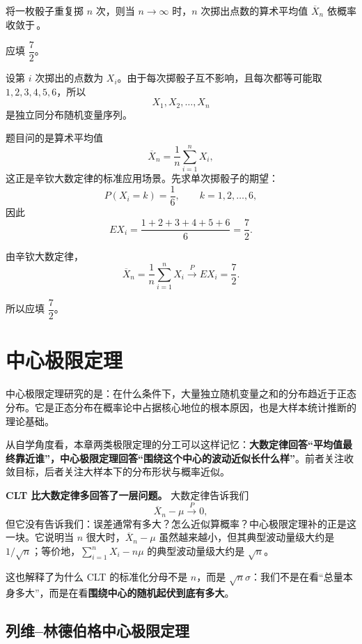﻿\documentclass[lang=cn,11pt]{elegantbook}
\begin{document}
\begin{exercise}\label{exer:5-lln-dice}
将一枚骰子重复掷 \(n\) 次，则当 \(n \to \infty\) 时，\(n\) 次掷出点数的算术平均值 \(\overline{X}_n\) 依概率收敛于\,\underline{\hspace{2cm}}。
\end{exercise}
\begin{solution}
应填 \(\dfrac{7}{2}\)。

设第 \(i\) 次掷出的点数为 \(X_i\)。由于每次掷骰子互不影响，且每次都等可能取 \(1,2,3,4,5,6\)，所以
\[
X_1, X_2, \dots, X_n
\]
是独立同分布随机变量序列。

题目问的是算术平均值
\[
\overline{X}_n=\frac1n\sum_{i=1}^n X_i,
\]
这正是辛钦大数定律的标准应用场景。先求单次掷骰子的期望：
\[
P(X_i=k)=\frac16,\qquad k=1,2,\dots,6,
\]
因此
\[
EX_i = \frac{1 + 2 + 3 + 4 + 5 + 6}{6} = \frac{7}{2}.
\]

由辛钦大数定律，
\[
\overline{X}_n = \frac{1}{n}\sum_{i=1}^{n} X_i \stackrel{P}{\longrightarrow} EX_i = \frac{7}{2}.
\]

所以应填 \(\dfrac{7}{2}\)。
\end{solution}



\section{中心极限定理}

中心极限定理研究的是：在什么条件下，大量独立随机变量之和的分布趋近于正态分布。它是正态分布在概率论中占据核心地位的根本原因，也是大样本统计推断的理论基础。

从自学角度看，本章两类极限定理的分工可以这样记忆：\textbf{大数定律回答“平均值最终靠近谁”，中心极限定理回答“围绕这个中心的波动近似长什么样”}。前者关注收敛目标，后者关注大样本下的分布形状与概率近似。

\begin{note}
\textbf{CLT 比大数定律多回答了一层问题。} 大数定律告诉我们
\[
\overline{X}_n-\mu \stackrel{P}{\longrightarrow} 0,
\]
但它没有告诉我们：误差通常有多大？怎么近似算概率？中心极限定理补的正是这一块。它说明当 \(n\) 很大时，\(\overline{X}_n-\mu\) 虽然越来越小，但其典型波动量级大约是 \(1/\sqrt{n}\)；等价地，\(\sum_{i=1}^n X_i-n\mu\) 的典型波动量级大约是 \(\sqrt{n}\)。

这也解释了为什么 CLT 的标准化分母不是 \(n\)，而是 \(\sqrt{n}\sigma\)：我们不是在看“总量本身多大”，而是在看\textbf{围绕中心的随机起伏到底有多大}。
\end{note}

\subsection{列维--林德伯格中心极限定理}
\end{document}
